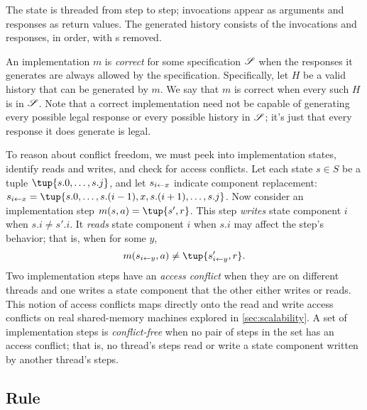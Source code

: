 \noindent The state is threaded from step to step;
invocations appear as arguments and responses as
return values. The generated history consists of the invocations
and responses, in order, with \CONTINUE{}s removed.

An implementation $m$ is \emph{correct} for some specification $\mathscr{S}$
when the responses it generates are always allowed by the specification.
Specifically, let $H$ be a valid history that can be generated by $m$.
We say that $m$ is correct when every such $H$ is in $\mathscr{S}$.
Note that a correct implementation need not be
capable of generating
every possible legal response or every possible history in $\mathscr{S}$;
it's just that every response it does
generate is legal.

To reason about conflict freedom, we must peek into
implementation states, identify reads and writes, and check for access
conflicts.
%
Let each state $s \in S$ be a tuple $\tup{s.0, \dots, s.j}$, and let
%
$s_{i\gets x}$ indicate component
replacement: $\tupleadj{s}{i}{x} = \tup{s.0,\dots,s.(i-1),x,s.(i+1),\dots,s.j}$.
%
Now consider an implementation step $m(s,a) = \tup{s', r}$.
%
This step \emph{writes} state component $i$
when $s.i \neq s'.i$.
%
It \emph{reads} state component $i$ when $s.i$ may affect the
step's behavior; that is, when for some $y$,
%
\[m(\tupleadj{s}{i}{y},a) \neq \tup{\tupleadj{s'}{i}{y}, r}.\]
%
Two implementation steps have an \emph{access conflict} when they are on
different threads and one writes a state component that the other either
writes or reads.
%
This notion of access conflicts maps directly onto the read and write access
conflicts on real shared-memory machines explored in
\cref{sec:scalability}.
%
A set of implementation steps is \emph{conflict-free}
when no pair of steps in the set has an access conflict; that is, no
thread's steps read or write a state component written by another
thread's steps.


\subsection{Rule}

